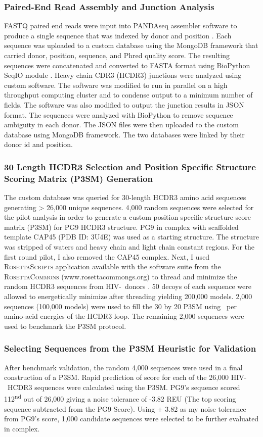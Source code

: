 \subsubsection{Paired-End Read Assembly and Junction Analysis}
FASTQ paired end reads were input into PANDAseq assembler software to produce a single sequence that was indexed by donor and position \citep{Bartram:2011cz}. Each sequence was uploaded to a custom database using the MongoDB framework that carried donor, position, sequence, and Phred quality score. The resulting sequences were concatenated and converted to FASTA format using BioPython SeqIO module \citep{Cock:2009hj}. Heavy chain CDR3 (HCDR3) junctions were analyzed using custom software. The software was modified to run in parallel on a high throughput computing cluster and to condense output to a minimum number of fields. The software was also modified to output the junction results in JSON format. The sequences were analyzed with BioPython to remove sequence ambiguity in each donor. The JSON files were then uploaded to the custom database using MongoDB framework. The two databases were linked by their donor id and position.

\subsubsection{30 Length HCDR3 Selection and Position Specific Structure Scoring Matrix (P3SM) Generation}
The custom database was queried for 30-length HCDR3 amino acid sequences generating > 26,000 unique sequences. 4,000 random sequences were selected for the pilot analysis in order to generate a custom position specific structure score matrix (P3SM) for PG9 HCDR3 structure. PG9 in complex with scaffolded template CAP45 (PDB ID: 3U4E) was used as a starting structure. The structure was stripped of waters and heavy chain and light chain constant regions. For the first round pilot, I also removed the CAP45 complex. Next, I used R\textsc{osetta}S\textsc{cripts} application available with the software suite from the R\textsc{osetta}C\textsc{ommons} (www.rosettacommongs.org) to thread and minimize the random HCDR3 sequences from HIV-\naive~donors \citep{Fleishman:2011ji}. 50 decoys of each sequence were allowed to energetically minimize after threading yielding 200,000 models. 2,000 sequences (100,000 models) were used to fill the 30 by 20 P3SM using \rosetta~per amino-acid energies of the HCDR3 loop. The remaining 2,000 sequences were used to benchmark the P3SM protocol.

\subsubsection{Selecting Sequences from the P3SM Heuristic for Validation}
After benchmark validation, the random 4,000 sequences were used in a final construction of a P3SM. Rapid prediction of score for each of the 26,000 HIV-\naive~HCDR3 sequences were calculated using the P3SM. PG9's sequence scored 112\textsuperscript{nd} out of 26,000 giving a noise tolerance of -3.82 REU (The top scoring sequence subtracted from the PG9 Score). Using $\pm$ 3.82 as my noise tolerance from PG9's score, 1,000 candidate sequences were selected to be further evaluated in complex.

